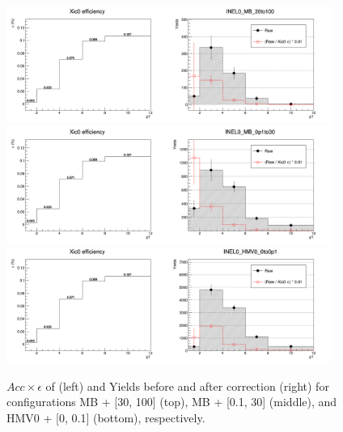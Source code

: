 \begin{appendix}
\begin{figure}[h]
    \centering
    \includegraphics[width=0.95\textwidth]{plots/s2_Xic0Eff_INEL0_MB_30to100.png} \\\vspace{5pt}
    \includegraphics[width=0.95\textwidth]{plots/s2_Xic0Eff_INEL0_MB_0p1to30.png} \\\vspace{5pt}
    \includegraphics[width=0.95\textwidth]{plots/s2_Xic0Eff_INEL0_HMV0_0to0p1.png}
    \caption{$Acc \times \epsilon$ of \Xic (left) and Yields before and after correction (right)
    for configurations MB + [30, 100] (top), MB + [0.1, 30] (middle), and HMV0 + [0, 0.1] (bottom), respectively.}
    \label{fig:appB_eff}
\end{figure}
\clearpage

\end{appendix}